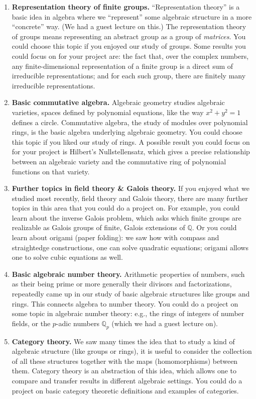\documentclass[11pt]{article}
\begin{document}
\begin{enumerate}

\item {\bf Representation theory of finite groups.} ``Representation theory'' is a basic idea in algebra where we ``represent'' some algebraic structure in a more ``concrete'' way. (We had a guest lecture on this.) The representation theory of groups means representing an abstract group as a group of \emph{matrices}. You could choose this topic if you enjoyed our study of groups. Some results you could focus on for your project are: the fact that, over the complex numbers, any finite-dimensional representation of a finite group is a direct sum of irreducible representations; and for each such group, there are finitely many irreducible representations.

\item {\bf Basic commutative algebra.} Algebraic geometry studies algebraic varieties, spaces defined by polynomial equations, like the way $x^2+y^2=1$ defines a circle. Commutative algebra, the study of modules over polynomial rings, is the basic algebra underlying algebraic geometry. You could choose this topic if you liked our study of rings. A possible result you could focus on for your project is Hilbert's Nullstellensatz, which gives a precise relationship between an algebraic variety and the commutative ring of polynomial functions on that variety.

\item {\bf Further topics in field theory \& Galois theory.} If you enjoyed what we studied most recently, field theory and Galois theory, there are many further topics in this area that you could do a project on. For example, you could learn about the inverse Galois problem, which asks which finite groups are realizable as Galois groups of finite, Galois extensions of $\mathbb{Q}$. Or you could learn about origami (paper folding): we saw how with compass and straightedge constructions, one can solve quadratic equations; origami allows one to solve cubic equations as well.

\item {\bf Basic algebraic number theory.} Arithmetic properties of numbers, such as their being prime or more generally their divisors and factorizations, repeatedly came up in our study of basic algebraic structures like groups and rings. This connects algebra to number theory. You could do a project on some topic in algebraic number theory: e.g., the rings of integers of number fields, or the $p$-adic numbers $\mathbb{Q}_p$ (which we had a guest lecture on).

\item {\bf Category theory.} We saw many times the idea that to study a kind of algebraic structure (like groups or rings), it is useful to consider the collection of all these structures together with the maps (homomorphisms) between them. Category theory is an abstraction of this idea, which allows one to compare and transfer results in different algebraic settings. You could do a project on basic category theoretic definitions and examples of categories.

\end{enumerate}
\end{document}
